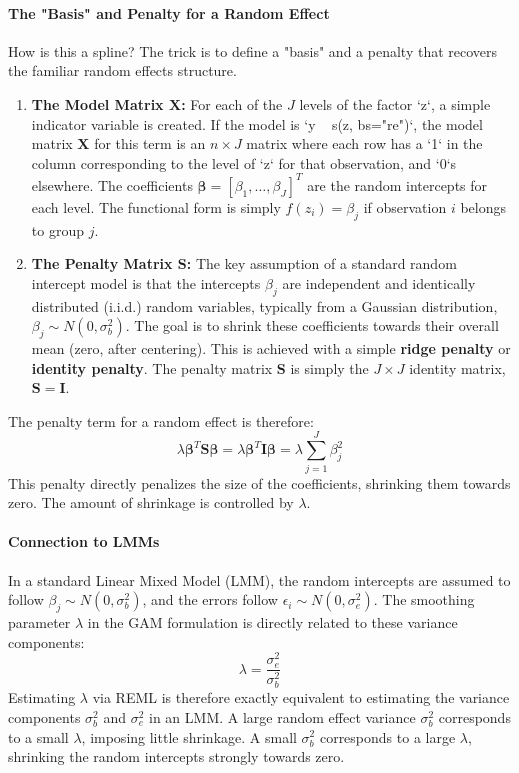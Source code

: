 \documentclass[11pt, a4paper]{article}
\begin{document}
\paragraph{The "Basis" and Penalty for a Random Effect}
How is this a spline? The trick is to define a "basis" and a penalty that recovers the familiar random effects structure.
\begin{enumerate}
    \item \textbf{The Model Matrix $\mathbf{X}$:} For each of the $J$ levels of the factor `z`, a simple indicator variable is created. If the model is `y ~ s(z, bs="re")`, the model matrix $\mathbf{X}$ for this term is an $n \times J$ matrix where each row has a `1` in the column corresponding to the level of `z` for that observation, and `0`s elsewhere. The coefficients $\boldsymbol{\beta} = [\beta_1, \dots, \beta_J]^T$ are the random intercepts for each level. The functional form is simply $f(z_i) = \beta_j$ if observation $i$ belongs to group $j$.

    \item \textbf{The Penalty Matrix $\mathbf{S}$:} The key assumption of a standard random intercept model is that the intercepts $\beta_j$ are independent and identically distributed (i.i.d.) random variables, typically from a Gaussian distribution, $\beta_j \sim N(0, \sigma_b^2)$. The goal is to shrink these coefficients towards their overall mean (zero, after centering). This is achieved with a simple \textbf{ridge penalty} or \textbf{identity penalty}. The penalty matrix $\mathbf{S}$ is simply the $J \times J$ identity matrix, $\mathbf{S} = \mathbf{I}$.
\end{enumerate}
The penalty term for a random effect is therefore:
\[ \lambda \boldsymbol{\beta}^T \mathbf{S} \boldsymbol{\beta} = \lambda \boldsymbol{\beta}^T \mathbf{I} \boldsymbol{\beta} = \lambda \sum_{j=1}^{J} \beta_j^2 \]
This penalty directly penalizes the size of the coefficients, shrinking them towards zero. The amount of shrinkage is controlled by $\lambda$.

\paragraph{Connection to LMMs}
In a standard Linear Mixed Model (LMM), the random intercepts are assumed to follow $\beta_j \sim N(0, \sigma_b^2)$, and the errors follow $\epsilon_i \sim N(0, \sigma_e^2)$. The smoothing parameter $\lambda$ in the GAM formulation is directly related to these variance components:
\[ \lambda = \frac{\sigma_e^2}{\sigma_b^2} \]
Estimating $\lambda$ via REML is therefore exactly equivalent to estimating the variance components $\sigma_b^2$ and $\sigma_e^2$ in an LMM. A large random effect variance $\sigma_b^2$ corresponds to a small $\lambda$, imposing little shrinkage. A small $\sigma_b^2$ corresponds to a large $\lambda$, shrinking the random intercepts strongly towards zero.
\end{document}
